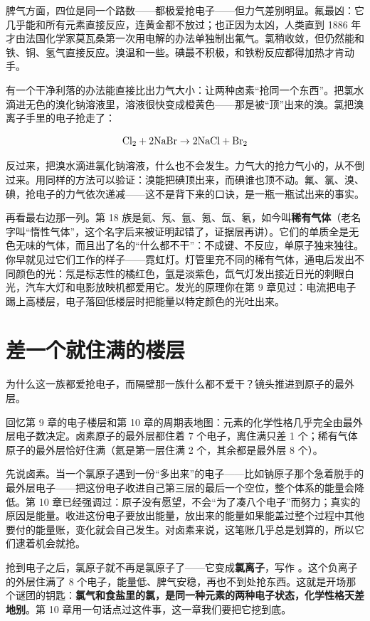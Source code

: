 脾气方面，四位是同一个路数——都极爱抢电子——但力气差别明显。氟最凶：它几乎能和所有元素直接反应，连黄金都不放过；也正因为太凶，人类直到 1886 年才由法国化学家莫瓦桑第一次用电解的办法单独制出氟气。氯稍收敛，但仍然能和铁、铜、氢气直接反应。溴温和一些。碘最不积极，和铁粉反应都得加热才肯动手。

有一个干净利落的办法能直接比出力气大小：让两种卤素“抢同一个东西”。把氯水滴进无色的溴化钠溶液里，溶液很快变成橙黄色——那是被“顶”出来的溴。氯把溴离子手里的电子抢走了：

\[\mathrm{Cl_2} + \mathrm{2NaBr} \rightarrow \mathrm{2NaCl} + \mathrm{Br_2}\]

反过来，把溴水滴进氯化钠溶液，什么也不会发生。力气大的抢力气小的，从不倒过来。用同样的方法可以验证：溴能把碘顶出来，而碘谁也顶不动。氟、氯、溴、碘，抢电子的力气依次递减——这不是背下来的口诀，是一瓶一瓶试出来的事实。

再看最右边那一列。第 18 族是氦、氖、氩、氪、氙、氡，如今叫\textbf{稀有气体}（老名字叫“惰性气体”，这个名字后来被证明起错了，证据层再讲）。它们的单质全是无色无味的气体，而且出了名的“什么都不干”：不成键、不反应，单原子独来独往。你早就见过它们工作的样子——霓虹灯。灯管里充不同的稀有气体，通电后发出不同颜色的光：氖是标志性的橘红色，氩是淡紫色，氙气灯发出接近日光的刺眼白光，汽车大灯和电影放映机都爱用它。发光的原理你在第 9 章见过：电流把电子踢上高楼层，电子落回低楼层时把能量以特定颜色的光吐出来。

\section{差一个就住满的楼层}

为什么这一族都爱抢电子，而隔壁那一族什么都不爱干？镜头推进到原子的最外层。

回忆第 9 章的电子楼层和第 10 章的周期表地图：元素的化学性格几乎完全由最外层电子数决定。卤素原子的最外层都住着 7 个电子，离住满只差 1 个；稀有气体原子的最外层恰好住满（氦是第一层住满 2 个，其余都是最外层 8 个）。

先说卤素。当一个氯原子遇到一份“多出来”的电子——比如钠原子那个急着脱手的最外层电子——把这份电子收进自己第三层的最后一个空位，整个体系的能量会降低。第 10 章已经强调过：原子没有愿望，不会“为了凑八个电子”而努力；真实的原因是能量。收进这份电子要放出能量，放出来的能量如果能盖过整个过程中其他要付的能量账，变化就会自己发生。对卤素来说，这笔账几乎总是划算的，所以它们逮着机会就抢。

抢到电子之后，氯原子就不再是氯原子了——它变成\textbf{氯离子}，写作 。这个负离子的外层住满了 8 个电子，能量低、脾气安稳，再也不到处抢东西。这就是开场那个谜团的钥匙：\textbf{氯气和食盐里的氯，是同一种元素的两种电子状态，化学性格天差地别}。第 10 章用一句话点过这件事，这一章我们要把它挖到底。

